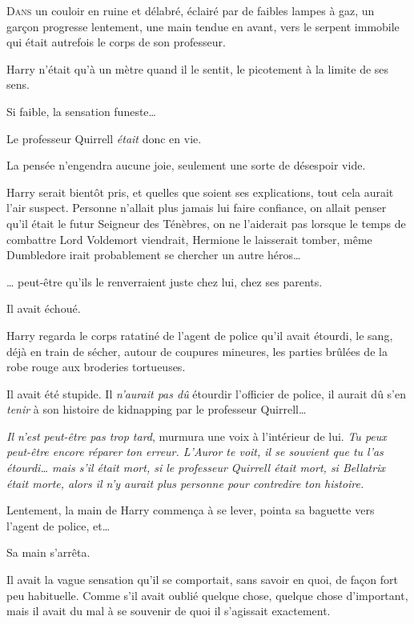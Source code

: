 
\lettrine{D}{ans} un couloir en ruine et délabré, éclairé par de faibles lampes à gaz, un garçon progresse lentement, une main tendue en avant, vers le serpent immobile qui était autrefois le corps de son professeur.

Harry n'était qu'à un mètre quand il le sentit, le picotement à la limite de ses sens.

Si faible, la sensation funeste…

Le professeur Quirrell \emph{était} donc en vie.

La pensée n'engendra aucune joie, seulement une sorte de désespoir vide.

Harry serait bientôt pris, et quelles que soient ses explications, tout cela aurait l'air suspect.
Personne n'allait plus jamais lui faire confiance, on allait penser qu'il était le futur Seigneur des Ténèbres, on ne l'aiderait pas lorsque le temps de combattre Lord Voldemort viendrait, Hermione le laisserait tomber, même Dumbledore irait probablement se chercher un autre héros…

… peut-être qu'ils le renverraient juste chez lui, chez ses parents.

Il avait échoué.

Harry regarda le corps ratatiné de l'agent de police qu'il avait étourdi, le sang, déjà en train de sécher, autour de coupures mineures, les parties brûlées de la robe rouge aux broderies tortueuses.

Il avait été stupide.
Il \emph{n'aurait pas dû} étourdir l'officier de police, il aurait dû s'en \emph{tenir} à son histoire de kidnapping par le professeur Quirrell…

\emph{Il n'est peut-être pas trop tard}, murmura une voix à l'intérieur de lui.
\emph{Tu peux peut-être encore réparer ton erreur.
L'Auror te voit, il se souvient que tu l'as étourdi… mais s'il était mort, si le professeur Quirrell était mort, si Bellatrix était morte, alors il n'y aurait plus personne pour contredire ton histoire.}

Lentement, la main de Harry commença à se lever, pointa sa baguette vers l'agent de police, et…

Sa main s'arrêta.

Il avait la vague sensation qu'il se comportait, sans savoir en quoi, de façon fort peu habituelle.
Comme s'il avait oublié quelque chose, quelque chose d'important, mais il avait du mal à se souvenir de quoi il s'agissait exactement.


